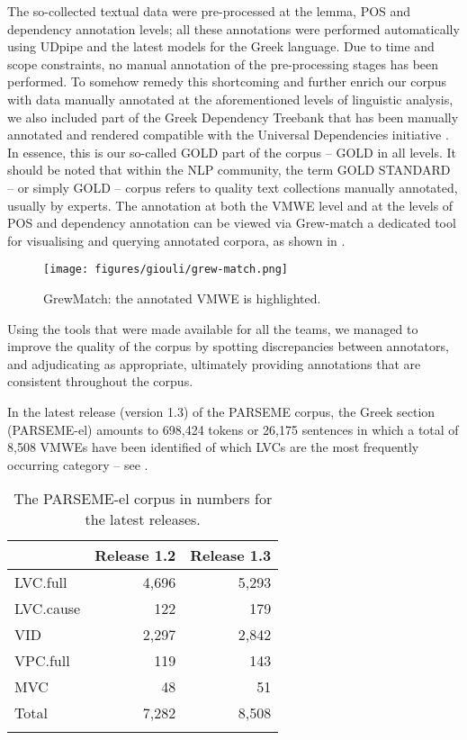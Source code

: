 \documentclass[output=paper,colorlinks,citecolor=brown]{langscibook}
\begin{document}
The so-collected textual data were pre-processed at the lemma, POS and dependency annotation levels; all these annotations were performed automatically using UDpipe \citep{straka_strakova_2017} and the latest models for the Greek language. Due to time and scope constraints, no manual annotation of the pre-processing stages has been performed. To somehow remedy this shortcoming and further enrich our corpus with data manually annotated at the aforementioned levels of linguistic analysis, we also included part of the Greek Dependency Treebank that has been manually annotated and rendered compatible with the Universal Dependencies initiative \citep{nivre-etal-2020-universal}. In essence, this is our so-called GOLD part of the corpus – GOLD in all levels. It should be noted that within the NLP community, the term GOLD STANDARD -- or simply GOLD – corpus refers to quality text collections manually annotated, usually by experts. 
The annotation at both the VMWE level and at the levels of POS and dependency annotation can be viewed via Grew-match \citep{guillaume-2021-graph} a dedicated tool for visualising and querying annotated corpora, as shown in .

\begin{figure}
    \centering
    \texttt{[image: figures/giouli/grew-match.png]}
    \caption{GrewMatch: the annotated VMWE is highlighted.}
    \label{fig:grew-match}
\end{figure}


Using the tools that were made available for all the teams, we managed to improve the quality of the corpus by spotting discrepancies between annotators, and adjudicating as appropriate, ultimately providing annotations that are consistent throughout the corpus.

In the latest release (version 1.3) of the PARSEME corpus, the Greek section (PARSEME-el) amounts to 698,424 tokens or 26,175 sentences \citep{savary-etal-2023-parseme} 
in which a total of 8,508 VMWEs have been identified of which LVCs are the most frequently occurring category -- see .

\begin{table}
\caption{The PARSEME-el corpus in numbers for the latest releases.}
\label{tab:numbers}
 \begin{tabularx}{.8\textwidth}{X rr}
  \lsptoprule
            & Release 1.2 & Release 1.3  \\
  \midrule
LVC.full  &   4,696  &    5,293 \\
LVC.cause  &   122 &   179 \\
VID  &   2,297 &   2,842 \\
VPC.full  &   119 &   143 \\
MVC  &   48 &   51 \\
 \midrule
Total &   7,282 &   8,508 \\
  \lspbottomrule
 \end{tabularx}
\end{table}
\end{document}

